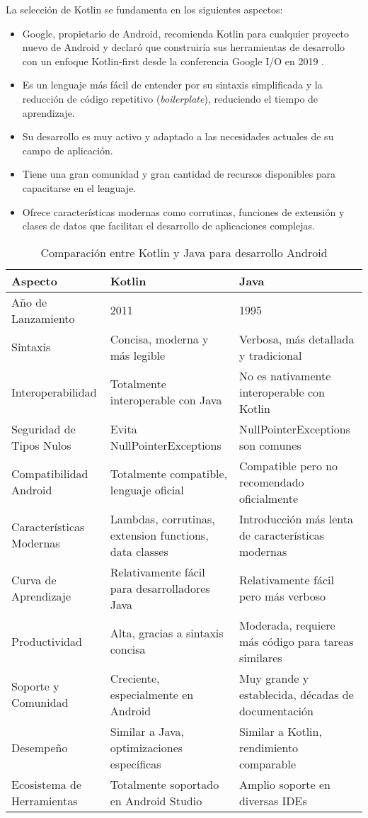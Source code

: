 La selección de Kotlin se fundamenta en los siguientes aspectos:

\begin{itemize}
    \item Google, propietario de Android, recomienda Kotlin para cualquier proyecto nuevo de Android y declaró que construiría sus herramientas de desarrollo con un enfoque Kotlin-first desde la conferencia Google I/O en 2019 \cite{Google2019}.
    \item Es un lenguaje más fácil de entender por su sintaxis simplificada y la reducción de código repetitivo (\textit{boilerplate}), reduciendo el tiempo de aprendizaje.
    \item Su desarrollo es muy activo y adaptado a las necesidades actuales de su campo de aplicación.
    \item Tiene una gran comunidad y gran cantidad de recursos disponibles para capacitarse en el lenguaje.
    \item Ofrece características modernas como corrutinas, funciones de extensión y clases de datos que facilitan el desarrollo de aplicaciones complejas.
\end{itemize}

\begin{table}[H]
\centering
\caption{Comparación entre Kotlin y Java para desarrollo Android}
\begin{tabular}{|p{}|p{}|p{}|}
\hline
\textbf{Aspecto} & \textbf{Kotlin} & \textbf{Java} \\
\hline
Año de Lanzamiento & 2011 & 1995 \\
\hline
Sintaxis & Concisa, moderna y más legible & Verbosa, más detallada y tradicional \\
\hline
Interoperabilidad & Totalmente interoperable con Java & No es nativamente interoperable con Kotlin \\
\hline
Seguridad de Tipos Nulos & Evita NullPointerExceptions & NullPointerExceptions son comunes \\
\hline
Compatibilidad Android & Totalmente compatible, lenguaje oficial & Compatible pero no recomendado oficialmente \\
\hline
Características Modernas & Lambdas, corrutinas, extension functions, data classes & Introducción más lenta de características modernas \\
\hline
Curva de Aprendizaje & Relativamente fácil para desarrolladores Java & Relativamente fácil pero más verboso \\
\hline
Productividad & Alta, gracias a sintaxis concisa & Moderada, requiere más código para tareas similares \\
\hline
Soporte y Comunidad & Creciente, especialmente en Android & Muy grande y establecida, décadas de documentación \\
\hline
Desempeño & Similar a Java, optimizaciones específicas & Similar a Kotlin, rendimiento comparable \\
\hline
Ecosistema de Herramientas & Totalmente soportado en Android Studio & Amplio soporte en diversas IDEs \\
\hline
\end{tabular}
\end{table}

